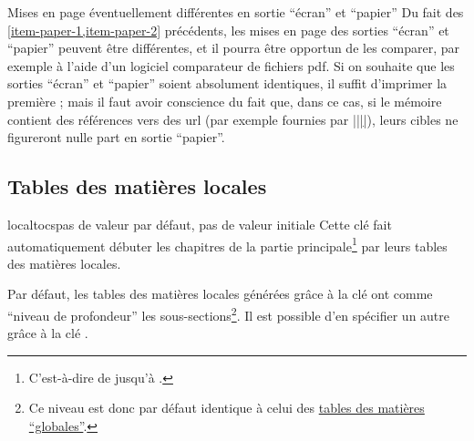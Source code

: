 \begin{dbwarning}{Mises en page éventuellement différentes en sortie
    \enquote{écran} et \enquote{papier}}{}
  Du fait des \cref{item-paper-1,item-paper-2} précédents, les mises en page
  des sorties \enquote{écran} et \enquote{papier} peuvent être différentes, et
  il pourra être opportun de les comparer, par exemple à l'aide d'un logiciel
  comparateur de fichiers \acrshort{pdf}. Si on souhaite que les sorties
  \enquote{écran} et \enquote{papier} soient absolument identiques, il suffit
  d'imprimer la première ; mais il faut avoir conscience du fait que, dans ce
  cas, si le mémoire contient des références vers des \acrshort{url} (par
  exemple fournies par |\href{|\meta{\acrshort*{url}}|}{||}|),
  leurs cibles ne figureront nulle part en sortie \enquote{papier}.
\end{dbwarning}

\subsection{Tables des matières locales}
\label{sec-localtoc}


\begin{docKey}[][doc new=2016-09-29]{localtocs}{}{pas de valeur par défaut, pas
    de valeur initiale} 
  Cette clé fait automatiquement débuter les chapitres de la partie
  principale\footnote{C'est-à-dire de  jusqu'à
    .} par leurs tables des matières locales.
\end{docKey}

Par défaut, les tables des matières locales générées grâce à la clé
 ont comme \enquote{niveau de profondeur} les
sous-sections\footnote{Ce niveau est donc par défaut identique à celui des
  \hyperref[sec-table-des-matieres]{tables des matières
    \enquote{globales}}.}. Il est possible d'en spécifier un autre grâce à la
clé .

